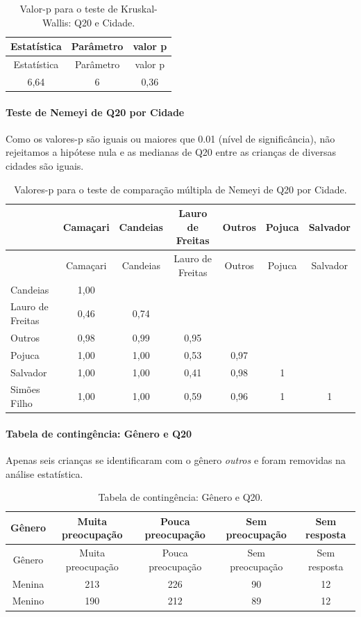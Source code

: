 \documentclass[]{article}
\let\oldparagraph\paragraph
\renewcommand{\paragraph}[1]{\oldparagraph{#1}\mbox{}}
\begin{document}
\begin{longtable}[]{@{}ccc@{}}
\caption{\label{tab:unnamed-chunk-373}Valor-p para o teste de Kruskal-Wallis: Q20 e Cidade.}\tabularnewline
\toprule
Estatística & Parâmetro & valor p\tabularnewline
\midrule
\endfirsthead
\toprule
Estatística & Parâmetro & valor p\tabularnewline
\midrule
\endhead
6,64 & 6 & 0,36\tabularnewline
\bottomrule
\end{longtable}

\hypertarget{teste-de-nemeyi-de-q20-por-cidade}{%
\paragraph{Teste de Nemeyi de Q20 por Cidade}\label{teste-de-nemeyi-de-q20-por-cidade}}

Como os valores-p são iguais ou maiores que 0.01 (nível de significância), não rejeitamos a hipótese nula e as medianas de Q20 entre as crianças de diversas cidades são iguais.

\begin{longtable}[]{@{}lcccccc@{}}
\caption{\label{tab:unnamed-chunk-375}Valores-p para o teste de comparação múltipla de Nemeyi de Q20 por Cidade.}\tabularnewline
\toprule
& Camaçari & Candeias & Lauro de Freitas & Outros & Pojuca & Salvador\tabularnewline
\midrule
\endfirsthead
\toprule
& Camaçari & Candeias & Lauro de Freitas & Outros & Pojuca & Salvador\tabularnewline
\midrule
\endhead
Candeias & 1,00 & & & & &\tabularnewline
Lauro de Freitas & 0,46 & 0,74 & & & &\tabularnewline
Outros & 0,98 & 0,99 & 0,95 & & &\tabularnewline
Pojuca & 1,00 & 1,00 & 0,53 & 0,97 & &\tabularnewline
Salvador & 1,00 & 1,00 & 0,41 & 0,98 & 1 &\tabularnewline
Simões Filho & 1,00 & 1,00 & 0,59 & 0,96 & 1 & 1\tabularnewline
\bottomrule
\end{longtable}

\cleardoublepage

\hypertarget{tabela-de-continguxeancia-guxeanero-e-q20}{%
\paragraph{Tabela de contingência: Gênero e Q20}\label{tabela-de-continguxeancia-guxeanero-e-q20}}

Apenas seis crianças se identificaram com o gênero \emph{outros} e foram removidas na análise estatística.

\begin{longtable}[]{@{}ccccc@{}}
\caption{\label{tab:unnamed-chunk-376}Tabela de contingência: Gênero e Q20.}\tabularnewline
\toprule
Gênero & Muita preocupação & Pouca preocupação & Sem preocupação & Sem resposta\tabularnewline
\midrule
\endfirsthead
\toprule
Gênero & Muita preocupação & Pouca preocupação & Sem preocupação & Sem resposta\tabularnewline
\midrule
\endhead
Menina & 213 & 226 & 90 & 12\tabularnewline
Menino & 190 & 212 & 89 & 12\tabularnewline
\bottomrule
\end{longtable}
\end{document}

